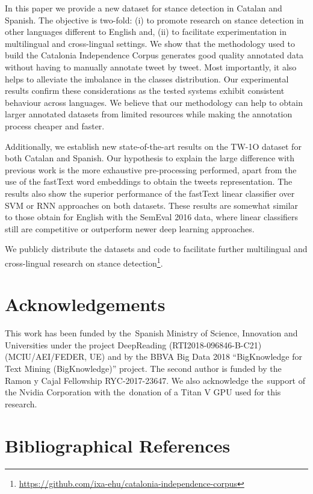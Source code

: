 \documentclass[10pt, a4paper]{article}
\begin{document}
In this paper we provide a new dataset for stance detection in Catalan and Spanish. The objective is two-fold: (i) to promote research on stance detection in other languages different to English and, (ii) to facilitate experimentation in multilingual and cross-lingual settings. We show that the methodology used to build the Catalonia Independence Corpus generates good quality annotated data without having to manually annotate tweet by tweet. Most importantly, it also helps to alleviate the imbalance in the classes distribution. Our experimental results confirm these considerations as the tested systems exhibit consistent behaviour across languages. We believe that our methodology can help to obtain larger annotated datasets from limited resources while making the annotation process cheaper and faster.

Additionally, we establish new state-of-the-art results on the TW-1O dataset for both Catalan and Spanish. Our hypothesis to explain the large difference with previous work is the more exhaustive pre-processing performed, apart from the use of the fastText word embeddings to obtain the tweets representation. The results also show the superior performance of the fastText linear classifier over SVM or RNN approaches on both datasets. These results are somewhat similar to those obtain for English with the SemEval 2016 data, where linear classifiers still are competitive or outperform newer deep learning approaches.

We publicly distribute the datasets and code to facilitate further multilingual and cross-lingual research on stance detection\footnote{\url{https://github.com/ixa-ehu/catalonia-independence-corpus}}.

\section{Acknowledgements}\label{sec:acknoledgements}

This work has been funded by the~Spanish Ministry of Science, Innovation and Universities under the project DeepReading (RTI2018-096846-B-C21) (MCIU/AEI/FEDER, UE) and by the BBVA Big Data 2018 ``BigKnowledge for Text Mining (BigKnowledge)'' project. The second author is funded by the Ramon y Cajal Fellowship RYC-2017-23647. We also acknowledge the~support of the Nvidia Corporation with the~donation of a Titan V GPU used for this research.

\section{Bibliographical References}\label{main:ref}





\end{document}
